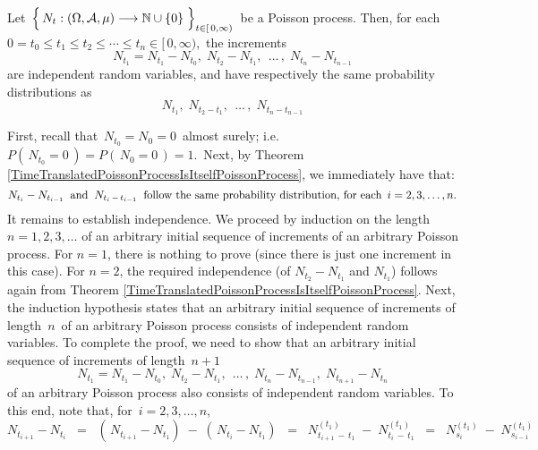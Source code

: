 \vskip 0.5cm
\begin{theorem}
\mbox{}
\vskip 0.15cm
\noindent
Let
\,$\left\{\,N_{t} : (\Omega,\mathcal{A},\mu) \overset{{\color{white}-}}{\longrightarrow} \N\cup\{0\} \;\right\}_{t \in [\,0,\infty)}$\,
be a Poisson process.
Then, for each \,$0 = t_{0} \leq t_{1} \leq t_{2} \leq \cdots \leq t_{n} \in [\,0,\infty)$,\,
the increments
\begin{equation*}
N_{t_{1}} = N_{t_{1}} - N_{t_{0}},\;
N_{t_{2}} - N_{t_{1}},\;
\,\ldots\,,\;
N_{t_{n}} - N_{t_{n-1}}
\end{equation*}
are independent random variables, and have respectively the same probability distributions as
\begin{equation*}
N_{t_{1}},\;
N_{t_{2} - t_{1}},\;
\,\ldots\,,\;
N_{t_{n} - t_{n-1}}
\end{equation*}
\end{theorem}
\proof
First, recall that \,$N_{t_{0}} = N_{0} = 0$\, almost surely;
i.e. \,$P(\,N_{t_{0}} = 0\,) = P(\,N_{0} = 0\,) = 1$.\,
Next, by Theorem \ref{TimeTranslatedPoissonProcessIsItselfPoissonProcess},
we immediately have that:
\begin{equation*}
N_{t_{i}} - N_{t_{i-1}}
\;\;\textnormal{and}\;\;
N_{t_{i} \,-\, t_{i-1}}
\;\;\textnormal{follow the same probability distribution, for each \,$i = 2, 3, \ldots, n$}.
\end{equation*}
It remains to establish independence.
We proceed by induction on the length $n = 1, 2, 3, \ldots $ of an arbitrary initial sequence of
increments of an arbitrary Poisson process.
For $n =1$, there is nothing to prove (since there is just one increment in this case).
For $n = 2$, the required independence (of $N_{t_{2}} - N_{t_{1}}$ and $N_{t_{1}}$)
follows again from Theorem \ref{TimeTranslatedPoissonProcessIsItselfPoissonProcess}.
Next, the induction hypothesis states that
an arbitrary initial sequence of increments of length \,$n$\, of an arbitrary Poisson process
consists of independent random variables.
To complete the proof, we need to show that 
an arbitrary initial sequence of increments of length \,$n+1$\,
\begin{equation*}
N_{t_{1}} = N_{t_{1}} - N_{t_{0}},\;
N_{t_{2}} - N_{t_{1}},\;
\,\ldots\,,\;
N_{t_{n}} - N_{t_{n-1}},\;
N_{t_{n+1}} - N_{t_{n}}
\end{equation*}
of an arbitrary Poisson process also consists of independent random variables.
To this end, note that, for \,$i = 2, 3, \ldots, n$,
\begin{equation*}
N_{t_{i+1}} - N_{t_{i}}
\;\; = \;\;
	\left(\,N_{t_{i+1}}-N_{t_{1}}\right) \;-\; \left(\,N_{t_{i}} - N_{t_{1}}\right)
\;\; = \;\;
	N^{(t_{1})}_{t_{i+1}\,-\,t_{1}}
	\;-\;
	N^{(t_{1})}_{t_{i}\,-\,t_{1}}
\;\; = \;\;
	N^{(t_{1})}_{s_{i}}
	\;-\;
	N^{(t_{1})}_{s_{i-1}}
\end{equation*}

